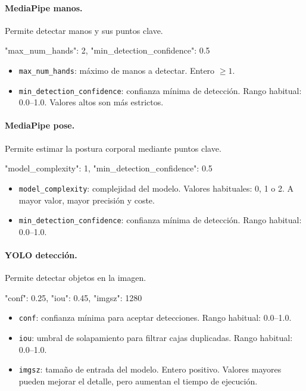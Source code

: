 \paragraph{MediaPipe manos.}
Permite detectar manos y sus puntos clave.

\begin{bloqueCodigo}[title={MediaPipe manos}]
	{
		"max_num_hands": 2,
		"min_detection_confidence": 0.5
	}
\end{bloqueCodigo}

\begin{itemize}
	\item \texttt{max\_num\_hands}: máximo de manos a detectar. Entero $\geq 1$.
	\item \texttt{min\_detection\_confidence}: confianza mínima de detección. Rango habitual: 0.0--1.0. Valores altos son más estrictos.
\end{itemize}

\paragraph{MediaPipe pose.}
Permite estimar la postura corporal mediante puntos clave.

\begin{bloqueCodigo}[title={MediaPipe pose}]
	{
		"model_complexity": 1,
		"min_detection_confidence": 0.5
	}
\end{bloqueCodigo}

\begin{itemize}
	\item \texttt{model\_complexity}: complejidad del modelo. Valores habituales: 0, 1 o 2. A mayor valor, mayor precisión y coste.
	\item \texttt{min\_detection\_confidence}: confianza mínima de detección. Rango habitual: 0.0--1.0.
\end{itemize}

\paragraph{YOLO detección.}
Permite detectar objetos en la imagen.

\begin{bloqueCodigo}[title={YOLO detección}]
	{
		"conf": 0.25,
		"iou": 0.45,
		"imgsz": 1280
	}
\end{bloqueCodigo}

\begin{itemize}
	\item \texttt{conf}: confianza mínima para aceptar detecciones. Rango habitual: 0.0--1.0.
	\item \texttt{iou}: umbral de solapamiento para filtrar cajas duplicadas. Rango habitual: 0.0--1.0.
	\item \texttt{imgsz}: tamaño de entrada del modelo. Entero positivo. Valores mayores pueden mejorar el detalle, pero aumentan el tiempo de ejecución.
\end{itemize}

